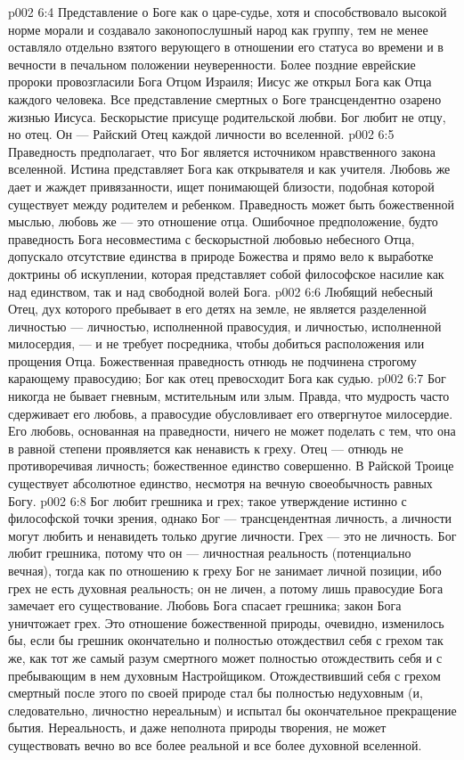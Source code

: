 \vs p002 6:4 \pc Представление о Боге как о царе\hyp{}судье, хотя и способствовало высокой норме морали и создавало законопослушный народ как группу, тем не менее оставляло отдельно взятого верующего в отношении его статуса во времени и в вечности в печальном положении неуверенности. Более поздние еврейские пророки провозгласили Бога Отцом Израиля; Иисус же открыл Бога как Отца каждого человека. Все представление смертных о Боге трансцендентно озарено жизнью Иисуса. Бескорыстие присуще родительской любви. Бог любит не  отцу, но  отец. Он --- Райский Отец каждой личности во вселенной.
\vs p002 6:5 \pc Праведность предполагает, что Бог является источником нравственного закона вселенной. Истина представляет Бога как открывателя и как учителя. Любовь же дает и жаждет привязанности, ищет понимающей близости, подобная которой существует между родителем и ребенком. Праведность может быть божественной мыслью, любовь же --- это отношение отца. Ошибочное предположение, будто праведность Бога несовместима с бескорыстной любовью небесного Отца, допускало отсутствие единства в природе Божества и прямо вело к выработке доктрины об искуплении, которая представляет собой философское насилие как над единством, так и над свободной волей Бога.
\vs p002 6:6 Любящий небесный Отец, дух которого пребывает в его детях на земле, не является разделенной личностью --- личностью, исполненной правосудия, и личностью, исполненной милосердия, --- и не требует посредника, чтобы добиться расположения или прощения Отца. Божественная праведность отнюдь не подчинена строгому карающему правосудию; Бог как отец превосходит Бога как судью.
\vs p002 6:7 \pc Бог никогда не бывает гневным, мстительным или злым. Правда, что мудрость часто сдерживает его любовь, а правосудие обусловливает его отвергнутое милосердие. Его любовь, основанная на праведности, ничего не может поделать с тем, что она в равной степени проявляется как ненависть к греху. Отец --- отнюдь не противоречивая личность; божественное единство совершенно. В Райской Троице существует абсолютное единство, несмотря на вечную своеобычность равных Богу.
\vs p002 6:8 \pc Бог любит грешника и  грех; такое утверждение истинно с философской точки зрения, однако Бог --- трансцендентная личность, а личности могут любить и ненавидеть только другие личности. Грех --- это не личность. Бог любит грешника, потому что он --- личностная реальность (потенциально вечная), тогда как по отношению к греху Бог не занимает личной позиции, ибо грех не есть духовная реальность; он не личен, а потому лишь правосудие Бога замечает его существование. Любовь Бога спасает грешника; закон Бога уничтожает грех. Это отношение божественной природы, очевидно, изменилось бы, если бы грешник окончательно и полностью отождествил себя с грехом так же, как тот же самый разум смертного может полностью отождествить себя и с пребывающим в нем духовным Настройщиком. Отождествивший себя с грехом смертный после этого по своей природе стал бы полностью недуховным (и, следовательно, личностно нереальным) и испытал бы окончательное прекращение бытия. Нереальность, и даже неполнота природы творения, не может существовать вечно во все более реальной и все более духовной вселенной.

